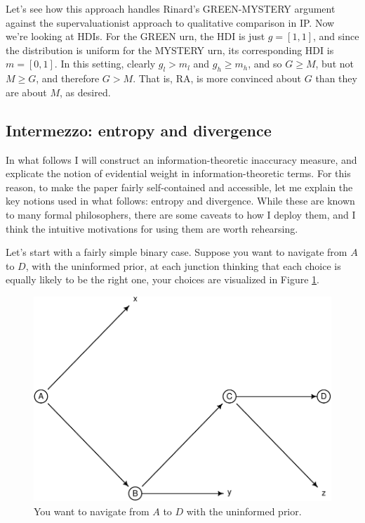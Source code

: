 \documentclass[
  10pt,
  dvipsnames,enabledeprecatedfontcommands]{scrartcl}
\begin{document}
Let's see how this approach handles Rinard's GREEN-MYSTERY argument
against the supervaluationist approach to qualitative comparison in IP.
Now we're looking at HDIs. For the GREEN urn, the HDI is just
\(g=[1,1]\), and since the distribution is uniform for the MYSTERY urn,
its corresponding HDI is \(m = [0,1]\). In this setting, clearly
\(g_l> m_l\) and \(g_h \geq m_h\), and so \(G\geq M\), but not
\(M\geq G\), and therefore \(G>M\). That is, RA, is more convinced about
\(G\) than they are about \(M\), as desired.

\hypertarget{intermezzo-entropy-and-divergence}{%
\subsection{Intermezzo: entropy and
divergence}\label{intermezzo-entropy-and-divergence}}

In what follows I will construct an information-theoretic inaccuracy
measure, and explicate the notion of evidential weight in
information-theoretic terms. For this reason, to make the paper fairly
self-contained and accessible, let me explain the key notions used in
what follows: entropy and divergence. While these are known to many
formal philosophers, there are some caveats to how I deploy them, and I
think the intuitive motivations for using them are worth rehearsing.

Let's start with a fairly simple binary case. Suppose you want to
navigate from \(A\) to \(D\), with the uninformed prior, at each
junction thinking that each choice is equally likely to be the right
one, your choices are visualized in Figure \ref{fig:entDAG}.

\begin{figure}[H]

\begin{center}\includegraphics[width=0.7\linewidth]{impreciseEpistemicFINAL_files/figure-latex/label-1} \end{center}
\caption{You want to navigate from $A$ to $D$ with the uninformed prior.}
\label{fig:entDAG}
\end{figure}
\end{document}
